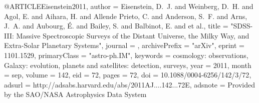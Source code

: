 \documentclass{aa}
\begin{document}
{{{{{{{{{{{{@ARTICLE{Eisenstein2011,
   author = {{Eisenstein}, D.~J. and {Weinberg}, D.~H. and {Agol}, E. and 
	{Aihara}, H. and {Allende Prieto}, C. and {Anderson}, S.~F. and 
	{Arns}, J.~A. and {Aubourg}, {\'E}. and {Bailey}, S. and {Balbinot}, E. and et al.},
    title = "{SDSS-III: Massive Spectroscopic Surveys of the Distant Universe, the Milky Way, and Extra-Solar Planetary Systems}",
  journal = {\aj},
archivePrefix = "arXiv",
   eprint = {1101.1529},
 primaryClass = "astro-ph.IM",
 keywords = {cosmology: observations, Galaxy: evolution, planets and satellites: detection, surveys},
     year = 2011,
    month = sep,
   volume = 142,
      eid = {72},
    pages = {72},
      doi = {10.1088/0004-6256/142/3/72},
   adsurl = {http://adsabs.harvard.edu/abs/2011AJ....142...72E},
  adsnote = {Provided by the SAO/NASA Astrophysics Data System}
}


}}}}}}}}}}}}
\end{document}
